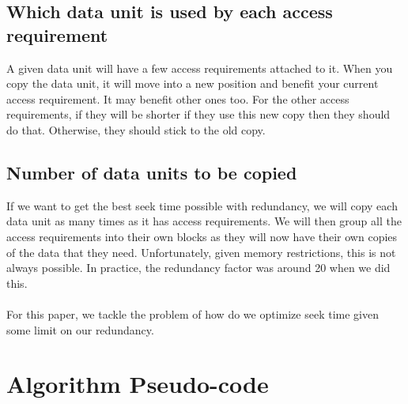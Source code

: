 \documentclass[11pt,psfig]{article}
\begin{document}
\subsection*{Which data unit is used by each access requirement}

A given data unit will have a few access requirements attached to it. When you copy the data unit, it will move into a new position and benefit your current access requirement. It may benefit other ones too. For the other access requirements, if they will be shorter if they use this new copy then they should do that. Otherwise, they should stick to the old copy. 

\subsection*{Number of data units to be copied} 

If we want to get the best seek time possible with redundancy, we will copy each data unit as many times as it has access requirements. We will then group all the access requirements into their own blocks as they will now have their own copies of the data that they need. Unfortunately, given memory restrictions, this is not always possible. In practice, the redundancy factor was around 20 when we did this. \\
\\
For this paper, we tackle the problem of how do we optimize seek time given some limit on our redundancy. 

\section*{Algorithm Pseudo-code}
\end{document}
